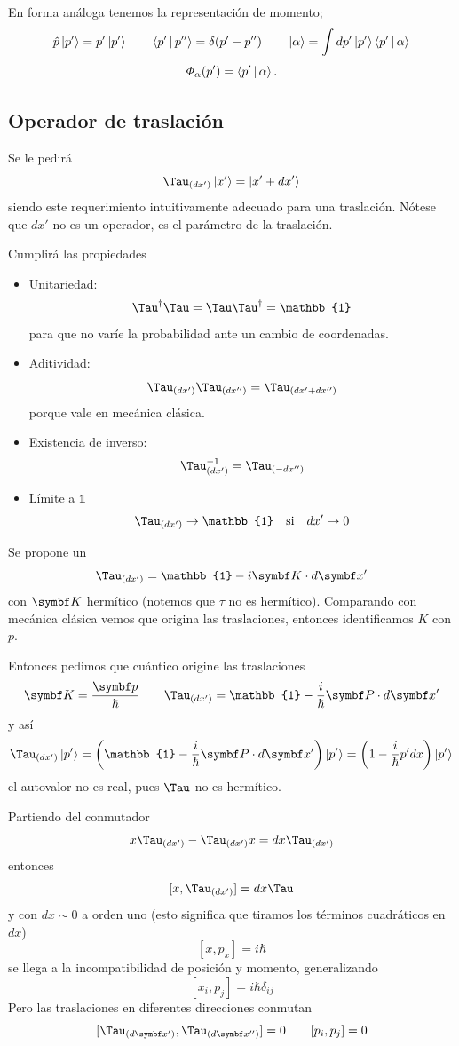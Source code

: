 \documentclass[10pt,oneside]{CBFT_book}
\begin{document}
En forma análoga tenemos la representación de momento;
\[
	\hat{p}\Ket{p'} = p'\Ket{p'} \qquad \Braket{p'|p''} = \delta(p'-p'') \qquad 
	\Ket{\alpha} = \int dp' \Ket{p'}\Braket{p'|\alpha}
\]
\[
	\Phi_\alpha(p') = \Braket{p'|\alpha}.
\]

\subsection{Operador de traslación}

Se le pedirá
\[
	\Tau_{(dx')} \Ket{x'} = \Ket{x'+dx'}
\]
siendo este requerimiento intuitivamente adecuado para una traslación. Nótese que $dx'$ no es un operador, es el 
parámetro de la traslación.

Cumplirá las propiedades
\begin{itemize}
 \item Unitariedad:
 \[
	\Tau^\dagger\Tau = \Tau \Tau^\dagger = \mathbb{1}
 \]
 para que no varíe la probabilidad ante un cambio de coordenadas.
 \item Aditividad:
 \[
	\Tau_{(dx')}\Tau_{(dx'')} = \Tau_{(dx'+dx'')}
 \]
 porque vale en mecánica clásica.
 \item Existencia de inverso:
 \[
	\Tau_{(dx')}^{-1} = \Tau_{(-dx'')}
 \]
 \item Límite a $\mathbb{1}$
 \[
	\Tau_{(dx')} \to \mathbb{1} \quad \text{si} \quad dx' \to 0
 \]
\end{itemize}

Se propone un 
\[
	\Tau_{(dx')} = \mathbb{1} - i \vb{K}\cdot d\vb{x}'
\]
con $\vb{K}$ hermítico (notemos que $\tau$ no es hermítico). Comparando con mecánica clásica vemos que  origina 
las traslaciones, entonces identificamos $K$ con $p$.

Entonces pedimos que  cuántico origine las traslaciones
\[
	\vb{K} = \frac{\vb{p}}{\hbar} \qquad \Tau_{(dx')} = \mathbb{1} - \frac{i}{\hbar} \vb{P}\cdot d\vb{x}'
\]
y así
\[
	\Tau_{(dx')}\Ket{p'} = \left( \mathbb{1} - \frac{i}{\hbar} \vb{P}\cdot d\vb{x}' \right)\Ket{p'} =
	\left( 1 - \frac{i}{\hbar} p' dx \right)\Ket{p'}
\]
el autovalor no es real, pues $\Tau$ no es hermítico.

Partiendo del conmutador 
\[
	x \Tau_{(dx')} - \Tau_{(dx')} x = dx \Tau_{(dx')}
\]
entonces 
\[
	[x, \Tau_{(dx')}] = dx\Tau 
\]
y con $dx\sim 0$ a orden uno (esto significa que tiramos los términos cuadráticos en $dx$)
\[
	[ x, p_x ] = i \hbar
\]
se llega a la incompatibilidad de posición y momento, generalizando
\[
	[ x_i, p_j ] = i \hbar \delta_{ij}
\]
Pero las traslaciones en diferentes direcciones conmutan
\[
	[ \Tau_{(d\vb{x}')}, \Tau_{(d\vb{x}'')} ] = 0  \qquad [ p_i, p_j ] = 0
\]
\end{document}
